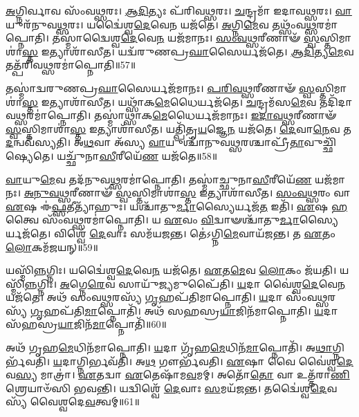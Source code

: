 \-\ul{𑌅}\-𑌗𑍍𑌨𑌿𑌰𑍍𑌵𑌾𑌵 𑌸𑌂᳴𑌵\-\ul{𑌥𑍍𑌸}\-𑌰𑌃।
\-\ul{𑌆}\-\-\ul{𑌦𑌿}\-𑌤𑍍𑌯𑌃 𑌪᳴𑌰𑌿𑌵\-\ul{𑌥𑍍𑌸}\-𑌰𑌃।
\-\ul{𑌚}\-𑌨𑍍𑌦𑍍𑌰𑌮𑌾᳴ 𑌇𑌦𑌾𑌵\-\ul{𑌥𑍍𑌸}\-𑌰𑌃।
\-\ul{𑌵𑌾}\-𑌯𑍁𑌰᳴𑌨𑍁𑌵\-\ul{𑌥𑍍𑌸}\-𑌰𑌃।
𑌯𑌦𑍍𑌵𑍈॑𑌶𑍍𑌵\-\ul{𑌦𑍇}\-𑌵𑍇\-\ul{𑌨} 𑌯𑌜᳴𑌤𑍇।
\-\ul{𑌅}\-𑌗𑍍𑌨𑌿\-\ul{𑌮𑍇}\-𑌵 𑌤𑌥𑍍𑌸𑌂᳴𑌵\-\ul{𑌥𑍍𑌸}\-𑌰𑌮𑌾॑𑌪𑍍𑌨𑍋𑌤𑌿।
𑌤𑌸𑍍𑌮𑌾॑𑌦𑍍𑌵𑍈𑌶𑍍𑌵\-\ul{𑌦𑍇}\-𑌵𑍇\-\ul{𑌨} 𑌯𑌜᳴𑌮𑌾𑌨𑌃।
\-\ul{𑌸𑌂}\-\-\ul{𑌵}\-\-\ul{𑌥𑍍𑌸}\-𑌰𑍀𑌣𑌾𑍟᳴ \ul{𑌸𑍍𑌵}\-𑌸𑍍𑌤𑌿𑌮𑌾𑌶𑌾॑\-\ul{𑌸𑍍𑌤} 𑌇𑌤𑍍𑌯𑌾𑌶𑌾᳴𑌸𑍀𑌤।
𑌯𑌦𑍍𑌵᳴𑌰𑍁𑌣\-𑌪𑍍𑌰\-\ul{𑌘𑌾}\-𑌸𑍈𑌰𑍍𑌯𑌜᳴𑌤𑍇।
\-\ul{𑌆}\-\-\ul{𑌦𑌿}\-𑌤𑍍𑌯\-\ul{𑌮𑍇}\-𑌵 𑌤𑌤𑍍𑌪᳴𑌰𑌿𑌵\-\ul{𑌥𑍍𑌸}\-𑌰𑌮𑌾॑𑌪𑍍𑌨𑍋𑌤𑌿॥57॥

𑌤𑌸𑍍𑌮𑌾॑𑌦𑍍𑌵𑌰𑍁𑌣𑌪𑍍𑌰\-\ul{𑌘𑌾}\-𑌸𑍈𑌰𑍍𑌯𑌜᳴𑌮𑌾𑌨𑌃।
\-\ul{𑌪}\-\-\ul{𑌰𑌿}\-\-\ul{𑌵}\-\-\ul{𑌥𑍍𑌸}\-𑌰𑍀𑌣𑌾𑍟᳴ \ul{𑌸𑍍𑌵}\-𑌸𑍍𑌤𑌿𑌮𑌾\-𑌶𑌾॑\-\ul{𑌸𑍍𑌤} 𑌇𑌤𑍍𑌯𑌾𑌶𑌾᳴𑌸𑍀𑌤।
𑌯𑌥𑍍𑌸𑌾᳴𑌕\-\ul{𑌮𑍇}\-𑌧𑍈𑌰𑍍𑌯𑌜᳴𑌤𑍇।
\-\ul{𑌚}\-𑌨𑍍𑌦𑍍𑌰𑌮᳴𑌸\-\ul{𑌮𑍇}\-𑌵 𑌤𑌦𑌿᳴𑌦𑌾𑌵\-\ul{𑌥𑍍𑌸}\-𑌰\-𑌮𑌾॑𑌪𑍍𑌨𑍋𑌤𑌿।
𑌤𑌸𑍍𑌮𑌾॑𑌥𑍍𑌸𑌾𑌕\-\ul{𑌮𑍇}\-𑌧𑍈𑌰𑍍𑌯𑌜᳴𑌮𑌾𑌨𑌃।
\-\ul{𑌇}\-\-\ul{𑌦𑌾}\-\-\-\ul{𑌵}\-\-\ul{𑌥𑍍𑌸}\-𑌰𑍀𑌣𑌾𑍟᳴ \ul{𑌸𑍍𑌵}\-𑌸𑍍𑌤𑌿𑌮𑌾𑌶𑌾॑\-\ul{𑌸𑍍𑌤} 𑌇𑌤𑍍𑌯𑌾𑌶𑌾᳴𑌸𑍀𑌤।
𑌯𑌤𑍍𑌪𑌿᳴𑌤𑍃\-\ul{𑌯}\-𑌜𑍍𑌞𑍇\-\ul{𑌨} 𑌯𑌜᳴𑌤𑍇।
\-\ul{𑌦𑍇}\-𑌵𑌾\-\ul{𑌨𑍇}\-𑌵 𑌤\-\ul{𑌦}\-𑌨𑍍𑌵𑌵᳴𑌸𑍍𑌯𑌤𑌿।
𑌅\-\ul{𑌥}\-𑌵𑌾 𑌅᳴𑌸𑍍𑌯 \ul{𑌵𑌾}\-𑌯𑍁𑌶𑍍𑌚𑌾᳴𑌨𑍁\-𑌵\-\ul{𑌥𑍍𑌸}\-𑌰𑌶𑍍𑌚𑌾𑌪𑍍𑌰𑍀᳴\-\ul{𑌤𑌾}\-\-𑌵𑍁𑌚𑍍𑌛𑌿᳴𑌷𑍍𑌯𑍇𑌤𑍇।
𑌯𑌚𑍍𑌛𑍁᳴𑌨𑌾\-\ul{𑌸𑍀}\-𑌰𑍀𑌯𑍇᳴\-\ul{𑌣} 𑌯𑌜᳴𑌤𑍇॥58॥

\-\ul{𑌵𑌾}\-𑌯𑍁\-\ul{𑌮𑍇}\-𑌵 𑌤𑌦᳴𑌨𑍁𑌵\-\ul{𑌥𑍍𑌸}\-𑌰𑌮𑌾॑𑌪𑍍𑌨𑍋𑌤𑌿।
𑌤𑌸𑍍𑌮𑌾॑𑌚𑍍𑌛𑍁𑌨𑌾\-\ul{𑌸𑍀}\-𑌰𑍀𑌯𑍇᳴\-\ul{𑌣} 𑌯𑌜᳴𑌮𑌾𑌨𑌃।
\-\ul{𑌅}\-\-\ul{𑌨𑍁}\-\-\ul{𑌵}\-\-\ul{𑌥𑍍𑌸}\-𑌰𑍀𑌣𑌾𑍟᳴ \ul{𑌸𑍍𑌵}\-𑌸𑍍𑌤𑌿𑌮𑌾𑌶𑌾॑\-\ul{𑌸𑍍𑌤} 𑌇𑌤𑍍𑌯𑌾𑌶𑌾᳴𑌸𑍀𑌤।
\-\ul{𑌸𑌂}\-\-\ul{𑌵}\-\-\ul{𑌥𑍍𑌸}\-𑌰𑌂 𑌵𑌾 \ul{𑌏}\-𑌷 𑌈॑\-\ul{𑌫𑍍𑌸}\-𑌤𑍀𑌤𑍍𑌯𑌾᳴𑌹𑍁𑌃।
𑌯𑌶𑍍𑌚𑌾᳴𑌤𑍁\-\ul{𑌰𑍍𑌮𑌾}\-𑌸𑍍𑌯𑍈𑌰𑍍𑌯𑌜᳴\-\ul{𑌤} 𑌇𑌤𑌿᳴।
\-\ul{𑌏}\-𑌷 \ul{𑌹} 𑌤𑍍𑌵𑍈 𑌸𑌂᳴𑌵\-\ul{𑌥𑍍𑌸}\-𑌰𑌮𑌾॑𑌪𑍍𑌨𑍋𑌤𑌿।
𑌯 \ul{𑌏}\-𑌵𑌂 \ul{𑌵𑌿}\-𑌦𑍍𑌵𑌾𑍟𑌶𑍍𑌚𑌾᳴𑌤𑍁\-\ul{𑌰𑍍𑌮𑌾}\-𑌸𑍍𑌯𑍈𑌰𑍍𑌯𑌜᳴𑌤𑍇।
𑌵𑌿𑌶𑍍𑌵𑍇᳴ \ul{𑌦𑍇}\-𑌵𑌾𑌃 𑌸𑌮᳴𑌯𑌜𑌨𑍍𑌤।
𑌤𑍇॑𑌽𑌗𑍍𑌨𑌿\-\ul{𑌮𑍇}\-𑌵𑌾𑌯᳴𑌜𑌨𑍍𑌤।
𑌤 \ul{𑌏}\-𑌤𑌂 \ul{𑌲𑍋}\-𑌕𑌮᳴𑌜𑌯𑌨𑍍॥59॥

𑌯𑌸𑍍𑌮𑌿᳴\-\ul{𑌨𑍍𑌨}\-𑌗𑍍𑌨𑌿𑌃।
𑌯𑌦𑍍𑌵𑍈॑𑌶𑍍𑌵\-\ul{𑌦𑍇}\-𑌵𑍇\-\ul{𑌨} 𑌯𑌜᳴𑌤𑍇।
\-\ul{𑌏}\-𑌤\-\ul{𑌮𑍇}\-𑌵 \ul{𑌲𑍋}\-𑌕𑌂 𑌜᳴𑌯𑌤𑌿।
𑌯𑌸𑍍𑌮𑌿᳴\-\ul{𑌨𑍍𑌨}\-𑌗𑍍𑌨𑌿𑌃।
\-\ul{𑌅}\-𑌗𑍍𑌨𑍇\-\ul{𑌰𑍇}\-𑌵 𑌸𑌾𑌯𑍁᳴\-\ul{𑌜𑍍𑌯}\-𑌮𑍁𑌪𑍈᳴𑌤𑌿।
\-\ul{𑌯}\-𑌦𑌾 𑌵𑍈॑𑌶𑍍𑌵\-\ul{𑌦𑍇}\-𑌵𑍇\-\ul{𑌨} 𑌯𑌜᳴𑌤𑍇।
𑌅𑌥᳴ 𑌸𑌂𑌵\-\ul{𑌥𑍍𑌸}\-𑌰𑌸𑍍𑌯᳴ \ul{𑌗𑍃}\-𑌹𑌪᳴𑌤𑌿𑌮𑌾𑌪𑍍𑌨𑍋𑌤𑌿।
\-\ul{𑌯}\-𑌦𑌾 𑌸𑌂᳴𑌵\-\ul{𑌥𑍍𑌸}\-𑌰𑌸𑍍𑌯᳴ \ul{𑌗𑍃}\-𑌹𑌪᳴𑌤𑌿\-\ul{𑌮𑌾}\-𑌪𑍍𑌨𑍋𑌤𑌿᳴।
𑌅𑌥᳴ 𑌸𑌹𑌸𑍍𑌰\-\ul{𑌯𑌾}\-𑌜𑌿𑌨᳴𑌮𑌾𑌪𑍍𑌨𑍋𑌤𑌿।
\-\ul{𑌯}\-𑌦𑌾 𑌸᳴𑌹𑌸𑍍𑌰\-\ul{𑌯𑌾}\-𑌜𑌿𑌨᳴\-\ul{𑌮𑌾}\-𑌪𑍍𑌨𑍋𑌤𑌿᳴॥60॥

𑌅𑌥᳴ 𑌗𑍃𑌹\-\ul{𑌮𑍇}\-𑌧𑌿𑌨᳴𑌮𑌾𑌪𑍍𑌨𑍋𑌤𑌿।
\-\ul{𑌯}\-𑌦𑌾 𑌗𑍃᳴𑌹\-\ul{𑌮𑍇}\-𑌧𑌿𑌨᳴\-\ul{𑌮𑌾}\-𑌪𑍍𑌨𑍋𑌤𑌿᳴।
𑌅\-\ul{𑌥𑌾}\-𑌗𑍍𑌨𑌿𑌰𑍍𑌭᳴𑌵𑌤𑌿।
\-\ul{𑌯}\-𑌦𑌾𑌗𑍍𑌨𑌿𑌰𑍍𑌭𑌵᳴𑌤𑌿।
𑌅\-\ul{𑌥} 𑌗𑍗𑌰𑍍𑌭᳴𑌵𑌤𑌿।
\-\ul{𑌏}\-𑌷𑌾 𑌵𑍈 𑌵𑍈॑𑌶𑍍𑌵\-\ul{𑌦𑍇}\-𑌵\-\ul{𑌸𑍍𑌯} 𑌮𑌾𑌤𑍍𑌰𑌾॑।
\-\ul{𑌏}\-𑌤𑌦𑍍𑌵𑌾 \ul{𑌏}\-𑌤𑍇𑌷𑌾᳴𑌮\-\ul{𑌵}\-𑌮𑌮𑍍।
𑌅𑌤𑍋᳴\-\ul{𑌤𑍋} 𑌵𑌾 𑌉𑌤𑍍𑌤᳴𑌰𑌾\-\ul{𑌣𑌿} 𑌶𑍍𑌰𑍇𑌯𑌾𑍞᳴𑌸𑌿 𑌭𑌵𑌨𑍍𑌤𑌿।
𑌯𑌦𑍍𑌵𑌿𑌶𑍍𑌵𑍇᳴ \ul{𑌦𑍇}\-𑌵𑌾𑌃 \ul{𑌸}\-𑌮𑌯᳴𑌜𑌨𑍍𑌤।
𑌤𑌦𑍍𑌵𑍈॑𑌶𑍍𑌵\-\ul{𑌦𑍇}\-𑌵𑌸𑍍𑌯᳴ 𑌵𑍈𑌶𑍍𑌵𑌦𑍇\-\ul{𑌵}\-𑌤𑍍𑌵𑌮𑍍॥61॥

